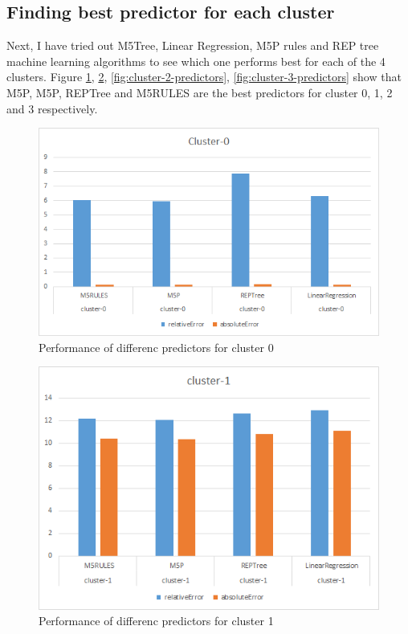 \subsection {Finding best predictor for each cluster}
Next, I have tried out  M5Tree, Linear Regression, M5P rules and REP tree machine learning algorithms to see which one performs best for each of the 4 clusters. Figure \ref{fig:cluster-0-predictors}, \ref{fig:cluster-1-predictors}, \ref{fig:cluster-2-predictors}, \ref{fig:cluster-3-predictors} show that M5P, M5P, REPTree and M5RULES are the best predictors for cluster 0, 1, 2 and 3 respectively.


\begin{figure}[h!]
  \includegraphics[width=\linewidth]{cluster-0-predictors.png}
  \caption{Performance of differenc predictors for cluster 0}
  \label{fig:cluster-0-predictors}
\end{figure}

\begin{figure}[h!]
  \includegraphics[width=\linewidth]{cluster-1-predictors.png}
  \caption{Performance of differenc predictors for cluster 1}
  \label{fig:cluster-1-predictors}
\end{figure}


